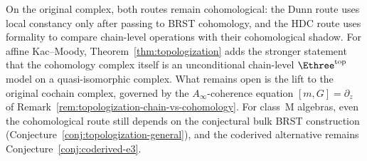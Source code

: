 \begin{remark}
On the original complex, both routes remain cohomological:
the Dunn route uses local constancy only after passing to
BRST cohomology, and the HDC route uses formality to compare
chain-level operations with their cohomological shadow. For
affine Kac--Moody, Theorem~\ref{thm:topologization} adds the
stronger statement that the cohomology complex itself is an
unconditional chain-level $\Ethree^{\mathrm{top}}$ model on a
quasi-isomorphic complex. What remains open is the lift to
the original cochain complex, governed by the
$A_\infty$-coherence equation
$[m,G]=\partial_z$ of
Remark~\ref{rem:topologization-chain-vs-cohomology}.
For class~M algebras, even the cohomological route still
depends on the conjectural bulk BRST construction
(Conjecture~\ref{conj:topologization-general}), and the
coderived alternative remains Conjecture~\ref{conj:coderived-e3}.
\end{remark}


